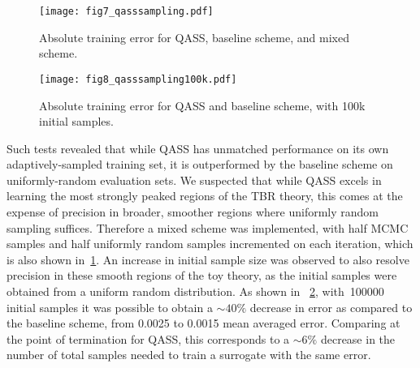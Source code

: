 \begin{figure}[h]
  \centering
    \texttt{[image: fig7\_qasssampling.pdf]}
    \caption{Absolute training error for QASS, baseline scheme, and mixed
	scheme.}
  \label{fig:qasssampling}
\end{figure}

\begin{figure}[h]
  \centering
    \texttt{[image: fig8\_qasssampling100k.pdf]}
    \caption{Absolute training error for QASS and baseline scheme, with 100k initial samples.}
  \label{fig:qasssampling100k}
\end{figure}

Such tests revealed that while QASS has unmatched performance on its own
adaptively-sampled training set, it is outperformed by the baseline scheme on
uniformly-random evaluation sets. We suspected that while QASS excels in
learning the most strongly peaked regions of the TBR theory, this comes at the
expense of precision in broader, smoother regions where uniformly random
sampling suffices. Therefore a mixed scheme was implemented, with half MCMC
samples and half uniformly random samples incremented on each iteration, which
is also shown in~\cref{fig:qasssampling}. An increase in initial sample size was observed to also resolve precision in these smooth regions of the toy theory, as the initial samples were obtained from a uniform random distribution. As shown in ~\cref{fig:qasssampling100k}, with~\num{100000} initial samples it was possible to obtain a ${\sim}40\%$ decrease in error as compared to the baseline scheme, from 0.0025 to 0.0015 mean averaged error. Comparing at the point of termination for QASS, this corresponds to a ${\sim}6\%$ decrease in the number of total samples needed to train a surrogate with the same error. 


